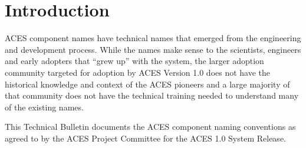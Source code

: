 \unnumberedformat	    %
\chapter{Introduction} 	%

ACES component names have technical names that emerged from the engineering and development process. While the names make sense to the scientists, engineers and early adopters that ``grew up'' with the system, the larger adoption community targeted for adoption by ACES Version 1.0 does not have the historical knowledge and context of the ACES pioneers and a large majority of that community does not have the technical training needed to understand many of the existing names.

This Technical Bulletin documents the ACES component naming conventions as agreed to by the ACES Project Committee for the ACES 1.0 System Release.
